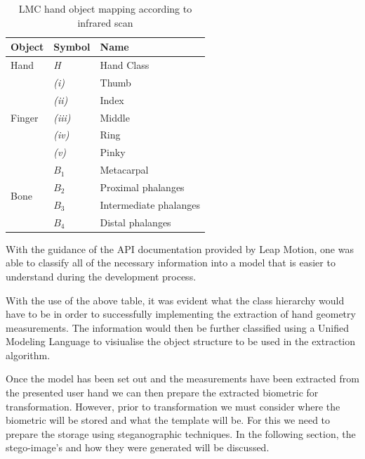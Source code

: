 

    \begin{table}[h!]
    \caption{LMC hand object mapping according to infrared scan}
    \centering
     \begin{tabular}{|p{} | p{}| p{}|} 
     \hline
    	\textbf{Object} & \textbf{Symbol} & \textbf{Name} \\ [1ex] 
     \hline\hline 
     Hand & \textit{H} & Hand Class  \\
     \hline 
     \multirow{5}{*}{Finger} & \textit{(i)} & Thumb \\

            & \textit{(ii)} & Index     \\
     
            & \textit{(iii)} & Middle     \\
     
            & \textit{(iv)} & Ring     \\
     
            & \textit{(v)} & Pinky      \\
    \hline        
    \multirow{4}{*}{Bone} & \(B_1\) & Metacarpal\\
     
            & \(B_2\) & Proximal phalanges     \\
     
            & \(B_3\) & Intermediate phalanges     \\
     
            & \(B_4\) & Distal phalanges     \\
     \hline
     \end{tabular}
    \end{table}
    
With the guidance of the API documentation provided by Leap Motion, one was able to classify all of the necessary information into a model that is easier to understand during the development process. 

With the use of the above table, it was evident what the class hierarchy would have to be in order to successfully implementing the extraction of hand geometry measurements. The information would then be further classified using a Unified Modeling Language to visiualise the object structure to be used in the extraction algorithm.

Once the model has been set out and the measurements have been extracted from the presented user hand we can then prepare the extracted biometric for transformation. However, prior to transformation we must consider where the biometric will be stored and what the template will be. For this we need to prepare the storage using steganographic techniques. In the following section, the stego-image’s and how they were generated will be discussed.

